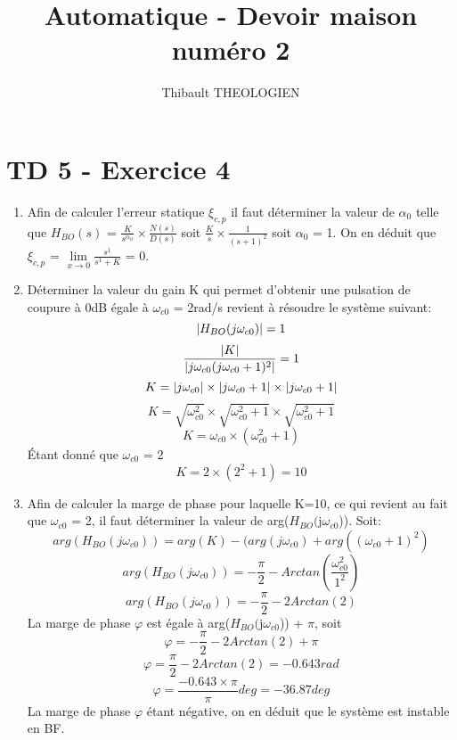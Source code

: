 \documentclass[a4paper,12pt]{article}
\title{Automatique - Devoir maison numéro 2}
\author{Thibault THEOLOGIEN}
\DeclarePairedDelimiter\abs{\lvert}{\rvert}
\begin{document}
	\maketitle
	
	\section{TD 5 - Exercice 4}
		\begin{enumerate}
			\item Afin de calculer l'erreur statique $\xi_{c,p}$ il faut déterminer la valeur de $\alpha_0$ telle que $H_{BO}(s)$ = $\frac{K}{s^{\alpha_O}} \times \frac{N(s)}{D(s)}$ soit $\frac{K}{s} \times \frac{1}{(s+1)^2}$ soit $\alpha_0$ = 1. On en déduit que $\xi_{c,p}$ = $\lim\limits_{x \to 0} \frac{s^1}{s^1 + K}$ = 0.
			\item Déterminer la valeur du gain K qui permet d'obtenir une pulsation de coupure à 0dB égale à $\omega_{c0}$ = 2rad/s revient à résoudre le système suivant:
				\[
				\abs{H_{BO}(j\omega_{c0})} = 1
				\]
				\[
					\frac{\abs{K}}
							 {\abs{ j\omega_{c0} (j\omega_{c0} + 1)^2}} = 1
				\] 
				\[
					K = \abs{j\omega_{c0}} \times \abs{j\omega_{c0} +1} \times \abs{j\omega_{c0} +1}
				\]
				\[
					K = \sqrt{\omega_{c0}^2} \times \sqrt{\omega_{c0}^2 + 1} \times \sqrt{\omega_{c0}^2 + 1}
				\]
				\[
					K = \omega_{c0} \times (\omega_{c0}^2 + 1)
				\]
				Étant donné que $\omega_{c0}$ = 2
				\[
					K = 2 \times (2^2 + 1) = 10
				\]
			\item Afin de calculer la marge de phase pour laquelle K=10, ce qui revient au fait que $\omega_{c0}$ = 2, il faut déterminer la valeur de arg($H_{BO}($j$\omega_{c0}$)).
			Soit: 
			\[
				arg(H_{BO}(j\omega_{c0})) = arg(K) - (arg(j\omega_{c0}) + arg((\omega_{c0} +1)^2)
			\]
			\[
				arg(H_{BO}(j\omega_{c0})) =  - \frac{\pi}{2} - Arctan(\frac{\omega_{c0}^2}{1^2})
			\]
			\[
				arg(H_{BO}(j\omega_{c0})) = - \frac{\pi}{2} - 2Arctan(2)
			\]
			La marge de phase $\varphi$ est égale à arg($H_{BO}($j$\omega_{c0}$)) + $\pi$, soit
			\[
				\varphi = - \frac{\pi}{2} - 2Arctan(2) + \pi
			\]
			\[
				\varphi = \frac{\pi}{2} - 2Arctan(2) = -0.643 rad 
			\]
			\[
				\varphi = \frac{-0.643 \times  \pi}{\pi} deg = -36.87 deg
			\]
			La marge de phase $\varphi$ étant négative, on en déduit que le système est instable en BF. 
		\end{enumerate}
\end{document}

